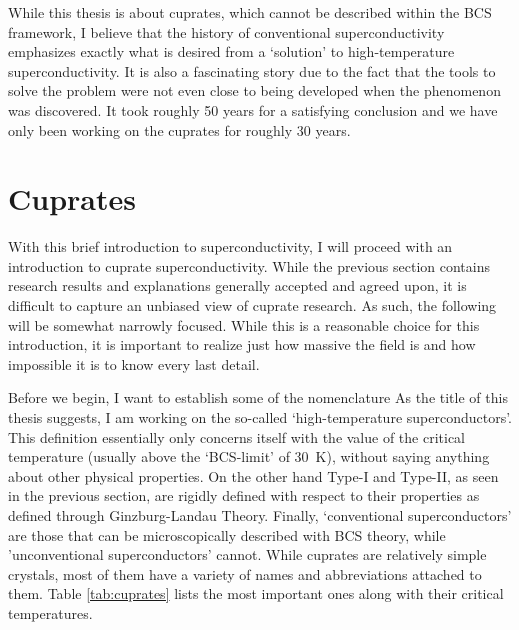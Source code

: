 While this thesis is about cuprates, which cannot be described within the BCS framework, I believe that the history of conventional superconductivity emphasizes exactly what is desired from a `solution' to high-temperature superconductivity. It is also a fascinating story due to the fact that the tools to solve the problem were not even close to being developed when the phenomenon was discovered. It took roughly 50 years for a satisfying conclusion and we have only been working on the cuprates for roughly 30 years. 

\section{Cuprates}\label{sec:cuprates}
With this brief introduction to superconductivity, I will proceed with an introduction to cuprate superconductivity. While the previous section contains research results and explanations generally accepted and agreed upon, it is difficult to capture an unbiased view of cuprate research. As such, the following will be somewhat narrowly focused. While this is a reasonable choice for this introduction, it is important to realize just how massive the field is and how impossible it is to know every last detail.

Before we begin, I want to establish some of the nomenclature  As the title of this thesis suggests, I am working on the so-called `high-temperature superconductors'. This definition essentially only concerns itself with the value of the critical temperature (usually above the `BCS-limit' of \SI{30}{\kelvin}), without saying anything about other physical properties. On the other hand Type-I and Type-II, as seen in the previous section, are rigidly defined with respect to their properties as defined through Ginzburg-Landau Theory. Finally, `conventional superconductors' are those that can be microscopically described with BCS theory, while 'unconventional superconductors' cannot. While cuprates are relatively simple crystals, most of them have a variety of names and abbreviations attached to them. Table \ref{tab:cuprates} lists the most important ones along with their critical temperatures.

